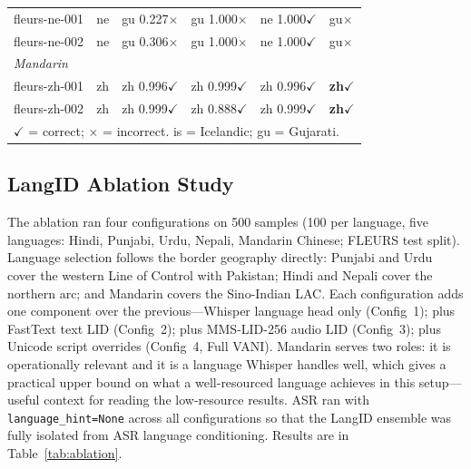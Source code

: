 \documentclass[12pt, onecolumn]{IEEEtran}
\begin{document}
\begin{table}[htbp]
\begin{center}
\begin{tabular}{p{2.0cm}lp{2.0cm}p{1.6cm}p{1.6cm}l}
fleurs-ne-001  & ne & gu 0.227$\times$ & gu 1.000$\times$ & ne 1.000$\checkmark$ & gu$\times$ \\
fleurs-ne-002  & ne & gu 0.306$\times$ & gu 1.000$\times$ & ne 1.000$\checkmark$ & gu$\times$ \\
\midrule
\multicolumn{6}{l}{\footnotesize\textit{Mandarin}} \\
fleurs-zh-001  & zh & zh 0.996$\checkmark$ & zh 0.999$\checkmark$ & zh 0.996$\checkmark$ & \textbf{zh}$\checkmark$ \\
fleurs-zh-002  & zh & zh 0.999$\checkmark$ & zh 0.888$\checkmark$ & zh 0.999$\checkmark$ & \textbf{zh}$\checkmark$ \\
\midrule
\multicolumn{6}{l}{\footnotesize$\checkmark$ = correct; $\times$ = incorrect. is = Icelandic; gu = Gujarati.} \\
\bottomrule
\end{tabular}
\end{center}
\end{table}

\subsection{LangID Ablation Study}
\label{sec:ablation}

The ablation ran four configurations on 500 samples (100 per language, five languages: Hindi, Punjabi, Urdu, Nepali, Mandarin Chinese; FLEURS test split). Language selection follows the border geography directly: Punjabi and Urdu cover the western Line of Control with Pakistan; Hindi and Nepali cover the northern arc; and Mandarin covers the Sino-Indian LAC. Each configuration adds one component over the previous---Whisper language head only (Config~1); plus FastText text LID (Config~2); plus MMS-LID-256 audio LID (Config~3); plus Unicode script overrides (Config~4, Full VANI). Mandarin serves two roles: it is operationally relevant and it is a language Whisper handles well, which gives a practical upper bound on what a well-resourced language achieves in this setup---useful context for reading the low-resource results. ASR ran with \texttt{language\_hint=None} across all configurations so that the LangID ensemble was fully isolated from ASR language conditioning. Results are in Table~\ref{tab:ablation}.
\end{document}
